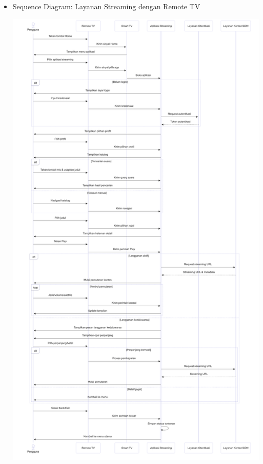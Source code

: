 \documentclass[a4paper]{article}
\begin{document}
\begin{enumerate}[itemsep=1em]
  \begin{itemize}[itemsep=1em]
    \item Sequence Diagram: Layanan Streaming dengan Remote TV
    \begin{center}
      \includegraphics[height=0.9\textheight,keepaspectratio]{streaming-sequence-diagram.png}
    \end{center}
  \end{itemize}
  
  \pagebreak


\end{enumerate}
\end{document}
